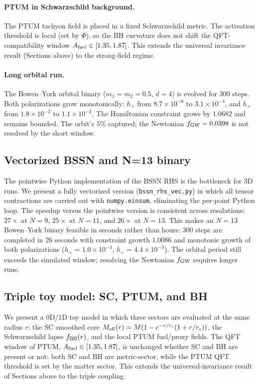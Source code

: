 \paragraph{PTUM in Schwarzschild background.}
The PTUM tachyon field is placed in a fixed Schwarzschild metric.
The activation threshold is local (set by $\Phi$), so the BH
curvature does not shift the QFT-compatibility window
$A_{\rm fuel} \in [1.35, 1.87]$. This extends the universal
invariance result (Sections above) to the strong-field regime.
\paragraph{Long orbital run.}
The Bowen--York orbital binary ($m_1 = m_2 = 0.5$, $d = 4$) is
evolved for 300 steps. Both polarizations grow monotonically:
$h_+$ from $8.7\times 10^{-6}$ to $3.1\times 10^{-4}$, and
$h_\times$ from $1.8\times 10^{-3}$ to $1.1\times 10^{-2}$. The
Hamiltonian constraint grows by $1.0682$ and remains bounded. The
orbit's $5\%$ captured; the Newtonian $f_{\rm GW} = 0.0398$ is
not resolved by the short window.

\subsection{Vectorized BSSN and N=13 binary}
The pointwise Python implementation of the BSSN RHS is the
bottleneck for 3D runs. We present a fully vectorized version
(\texttt{bssn\_rhs\_vec.py}) in which all tensor contractions are
carried out with \texttt{numpy.einsum}, eliminating the per-point
Python loop. The speedup versus the pointwise version is
consistent across resolutions:
$27\times$ at $N=9$, $25\times$ at $N=11$, and $26\times$ at
$N=13$. This makes an $N=13$ Bowen--York binary feasible in
seconds rather than hours: 300 steps are completed in 26 seconds
with constraint growth $1.0086$ and monotonic growth of both
polarizations ($h_+ = 1.0\times 10^{-4}$, $h_\times = 4.4\times
10^{-3}$). The orbital period still exceeds the simulated window;
resolving the Newtonian $f_{\rm GW}$ requires longer runs.

\subsection{Triple toy model: SC, PTUM, and BH}
We present a 0D/1D toy model in which three sectors are evaluated
at the same radius $r$: the SC smoothed core $M_{\rm eff}(r) =
M(1 - e^{-r/r_c}(1 + r/r_c))$, the Schwarzschild lapse
$f_{\rm BH}(r)$, and the local PTUM fuel/proxy fields. The QFT
window of PTUM, $A_{\rm fuel} \in [1.35, 1.87]$, is unchanged
whether SC and BH are present or not: both SC and BH are
metric-sector, while the PTUM QFT threshold is set by the matter
sector. This extends the universal-invariance result of
Sections above to the triple coupling.

